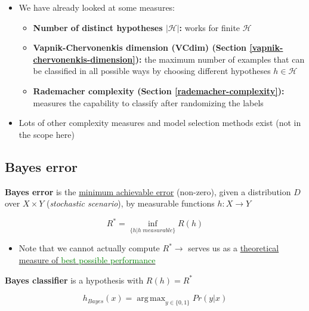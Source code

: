 \documentclass[12pt, a4paper]{article}
\DeclareMathOperator*{\argmax}{arg\,max} %
\begin{document}
\begin{itemize}
  \item We have already looked at some measures:
  \begin{itemize}
    \item \textbf{Number of distinct hypotheses $|\mathcal{H}|$:} works for finite $\mathcal{H}$
    \item \textbf{Vapnik-Chervonenkis dimension (VCdim) (Section \ref{vapnik-chervonenkis-dimension}):} the maximum number of examples that can be classified in all possible ways by choosing different hypotheses $h \in \mathcal{H}$
    \item \textbf{Rademacher complexity (Section \ref{rademacher-complexity}):} measures the capability to classify after randomizing the labels
  \end{itemize}
  \item Lots of other complexity measures and model selection methods exist (not in the scope here)
\end{itemize}















\subsection{Bayes error}\label{bayes-error}

\textbf{Bayes error} is the \uline{minimum achievable error} (non-zero), given a distribution $D$ over $X \times Y$ (\textit{stochastic scenario}), by measurable functions $h: X \rightarrow Y$

$$
R^* = \inf_{\{h | h\;measurable\}} R(h)
$$

\begin{itemize}
  \item Note that we cannot actually compute $R^* \rightarrow$ serves us as a \uline{theoretical measure of \textcolor{Green}{best possible performance}}
\end{itemize}


\bigskip


\textbf{Bayes classifier} is a hypothesis with $R(h) = R^*$

$$
h_{Bayes}(x) = \argmax_{y \in \{0,1\}} Pr(y|x)
$$
\end{document}
